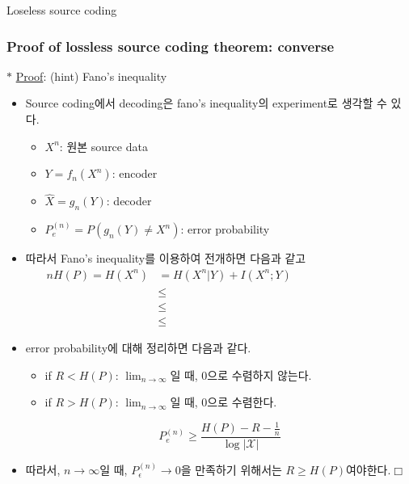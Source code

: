 \documentclass[9pt]{beamer}
\begin{document}
\begin{section}{Loseless source coding}
        \begin{frame}
            \frametitle{Proof of lossless source coding theorem: converse}
            $\ast$ \underline{Proof}: (hint) Fano's inequality
            \vspace{0.2cm}
            \begin{itemize}
                \item Source coding에서 decoding은 fano's inequality의 experiment로 생각할 수 있다.
                \begin{itemize}
                    \item $X^n$: 원본 source data
                    \item $Y=f_n(X^n)$: encoder
                    \item $\hat X = g_n(Y)$: decoder 
                    \item $P_e^{(n)} = P(g_n(Y) \ne X^n)$: error probability
                \end{itemize}
                \item 따라서 Fano's inequality를 이용하여 전개하면 다음과 같고
                \begin{align*} 
                nH(P) = H(X^n) &= H(X^n | Y) + I(X^n ; Y)\\
                &\le \qquad \qquad \qquad \qquad \qquad \qquad \qquad \qquad \qquad \qquad\\
                &\le \\
                &\le
                \end{align*}
                \item error probability에 대해 정리하면 다음과 같다.
                \begin{itemize}
                    \item if $R<H(P)$: $\lim_{n \rightarrow \infty}$일 때, 0으로 수렴하지 않는다.
                    \item if $R>H(P)$: $\lim_{n \rightarrow \infty}$일 때, 0으로 수렴한다.
                \end{itemize}
                $$
                P_e^{(n)} \geq \frac{H(P)-R-\frac{1}{n}}{\log |\mathcal{X}|}
                $$
                \item 따라서, $n\rightarrow \infty$일 때, $P^{(n)}_\epsilon \rightarrow 0$을 만족하기 위해서는 $R \ge H(P)$여야한다.$\Box$  %
            \end{itemize}
        \end{frame}


\end{section}
\end{document}
